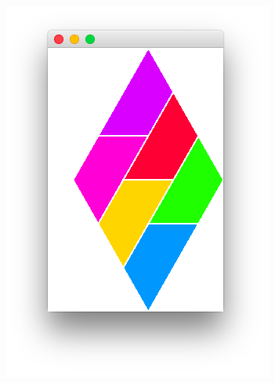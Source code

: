 \documentclass[a4paper,12pt]{article}
\begin{document}
\begin{figure}[h!]
\begin{subfigure}{0.22\textwidth}
		\includegraphics[width=\textwidth]{figures/task10_2.png}
		\caption{}
	\end{subfigure}
	\begin{subfigure}{0.2\textwidth}

\end{subfigure}
\end{figure}
\end{document}
